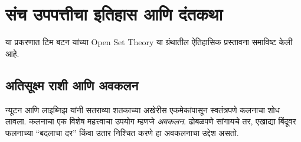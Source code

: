 \chapter{संच उपपत्तीचा इतिहास आणि दंतकथा}\label{his:set:chap}
\begin{editorial}
या प्रकरणात टिम बटन यांच्या Open Set Theory या ग्रंथातील ऐतिहासिक प्रस्तावना
समाविष्ट केली आहे.
\end{editorial}




\section{अतिसूक्ष्म राशी आणि अवकलन}\label{his:set:infinitesimals:sec}

न्यूटन आणि लाइब्निझ यांनी सतराव्या शतकाच्या अखेरीस एकमेकांपासून स्वतंत्रपणे कलनाचा शोध लावला. कलनाचा एक विशेष महत्त्वाचा उपयोग म्हणजे \emph{अवकलन}. ढोबळपणे सांगायचे तर, एखाद्या बिंदूवर फलनाच्या “बदलाचा दर” किंवा उतार निश्चित करणे हा अवकलनाचा उद्देश असतो.

